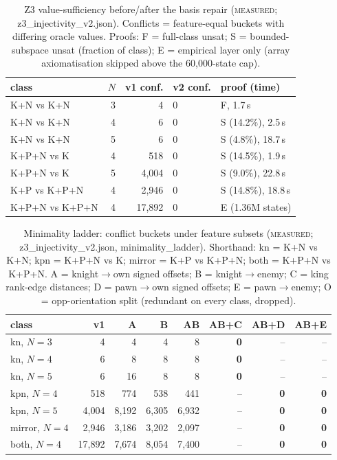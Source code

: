 \documentclass[conference]{IEEEtran}
\newcommand{\tierm}{\textsc{measured}}
\begin{document}
\begin{table}[t]
\caption{Z3 value-sufficiency before/after the basis repair (\tierm{};
z3\_injectivity\_v2.json). Conflicts = feature-equal buckets with differing
oracle values. Proofs: F = full-class unsat; S = bounded-subspace unsat
(fraction of class); E = empirical layer only (array axiomatisation skipped
above the 60{,}000-state cap).}
\label{tab:z3}
\centering
\footnotesize
\setlength{\tabcolsep}{3.2pt}
\begin{tabular}{lrrll}
\toprule
class & $N$ & v1 conf. & v2 conf. & proof (time) \\
\midrule
K+N vs K+N     & 3 & 4 & 0 & F, 1.7\,s \\
K+N vs K+N     & 4 & 6 & 0 & S (14.2\%), 2.5\,s \\
K+N vs K+N     & 5 & 6 & 0 & S (4.8\%), 18.7\,s \\
K+P+N vs K     & 4 & 518 & 0 & S (14.5\%), 1.9\,s \\
K+P+N vs K     & 5 & 4{,}004 & 0 & S (9.0\%), 22.8\,s \\
K+P vs K+P+N   & 4 & 2{,}946 & 0 & S (14.8\%), 18.8\,s \\
K+P+N vs K+P+N & 4 & 17{,}892 & 0 & E (1.36M states) \\
\bottomrule
\end{tabular}
\end{table}

\begin{table}[t]
\caption{Minimality ladder: conflict buckets under feature subsets
(\tierm{}; z3\_injectivity\_v2.json, minimality\_ladder). Shorthand:
kn = K+N vs K+N; kpn = K+P+N vs K; mirror = K+P vs K+P+N; both = K+P+N vs
K+P+N. A = knight$\to$own
signed offsets; B = knight$\to$enemy; C = king rank-edge distances;
D = pawn$\to$own signed offsets; E = pawn$\to$enemy; O = opp-orientation
split (redundant on every class, dropped).}
\label{tab:ladder}
\centering
\footnotesize
\setlength{\tabcolsep}{3pt}
\begin{tabular}{lrrrrrrr}
\toprule
class & v1 & A & B & AB & AB+C & AB+D & AB+E \\
\midrule
kn, $N{=}3$ & 4 & 4 & 4 & 8 & \textbf{0} & -- & -- \\
kn, $N{=}4$ & 6 & 8 & 8 & 8 & \textbf{0} & -- & -- \\
kn, $N{=}5$ & 6 & 16 & 8 & 8 & \textbf{0} & -- & -- \\
kpn, $N{=}4$ & 518 & 774 & 538 & 441 & -- & \textbf{0} & \textbf{0} \\
kpn, $N{=}5$ & 4{,}004 & 8{,}192 & 6{,}305 & 6{,}932 & -- & \textbf{0} & \textbf{0} \\
mirror, $N{=}4$ & 2{,}946 & 3{,}186 & 3{,}202 & 2{,}097 & -- & \textbf{0} & \textbf{0} \\
both, $N{=}4$ & 17{,}892 & 7{,}674 & 8{,}054 & 7{,}400 & -- & \textbf{0} & \textbf{0} \\
\bottomrule
\end{tabular}
\end{table}
\end{document}
